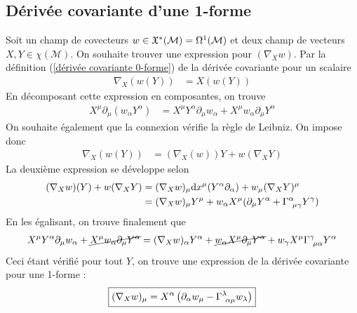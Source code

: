\subsection{Dérivée covariante d'une 1-forme}
Soit un champ de covecteurs $w \in \mathfrak{X}^*(\mathcal{M}) = \Omega^1(\mathcal{M})$ et deux champ de vecteurs $X, Y \in \chi(\mathcal{M})$. On souhaite trouver une expression pour $(\nabla_X w)$. Par la définition (\ref{dérivée covariante 0-forme}) de la dérivée covariante pour un scalaire 
\begin{align}
    \nabla_X(w(Y)) &= X(w(Y))
\end{align}
En décomposant cette expression en composantes, on trouve
\begin{align}
    X^{\mu}\partial_{\mu}(w_{\alpha} Y^{\alpha})&= X^{\mu}Y^{\alpha}\partial_{\mu}w_{\alpha} + X^{\mu}w_{\alpha}\partial_{\mu}Y^{\alpha}
    \label{dérivée covarantes 1-forme 2}
\end{align}
On souhaite également que la connexion vérifie la règle de Leibniz. On impose donc 
\begin{align}           
    \nabla_X(w(Y))&= (\nabla_X(w))Y + w(\nabla_X Y)
\end{align}
La deuxième expression se développe selon
\begin{align}
    (\nabla_X w)(Y) + w(\nabla_X Y) &= (\nabla_X w)_{\mu}\td x^{\mu}(Y^{\alpha}\partial_{\alpha}) +  w_\mu (\nabla_X Y)^\mu\\
    & = (\nabla_X w)_{\mu}Y^{\mu} + w_{\alpha}X^{\mu} (\partial_{\mu}Y^{\alpha} + \Gamma\indices{^{\alpha}_{\!\mu \gamma}}Y^{\gamma})
\end{align}
En les égalisant, on trouve finalement que
\begin{align}
    X^{\mu}Y^{\alpha}\partial_{\mu}w_{\alpha} + \cancel{X^{\mu}w_{\alpha}\partial_{\mu}Y^{\alpha}} = (\nabla_X w)_{\alpha}Y^{\alpha} + \cancel{w_{\alpha}X^{\mu}\partial_{\mu}Y^{\alpha}} + w_{\gamma}X^{\mu}\Gamma\indices{^{\gamma}_{\!\mu \alpha}}Y^{\alpha}
\end{align}    
Ceci étant vérifié pour tout $Y$, on trouve une expression de la dérivée covariante pour une 1-forme :
\begin{equation}
    \boxed{(\nabla_X w)_{\mu} = X^{\alpha} \lt \partial_{\alpha}w_{\mu} - \Gamma\indices{^{\lambda}_{\!\alpha \mu}}w_{\lambda} \rt}
    \label{dérivée covariance 1-forme egalisé 1}
\end{equation}

